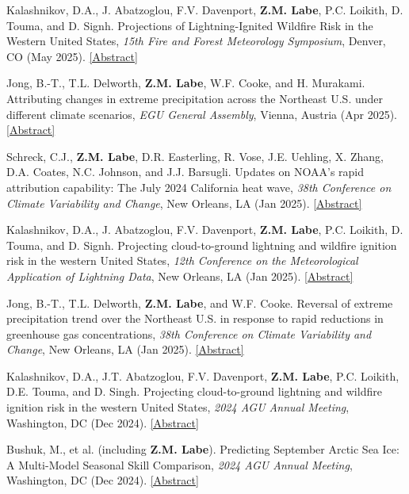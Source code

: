 \documentclass[margin,line,palatino,courier,10pt]{res}
\begin{document}
\begin{resume}
\begin{etaremune}[leftmargin=0in,topsep=0in,parsep=0in]
\item Kalashnikov, D.A., J. Abatzoglou, F.V. Davenport, \textbf{Z.M. Labe}, P.C. Loikith, D. Touma, and D. Signh. Projections of Lightning-Ignited Wildfire Risk in the Western United States, \textit{15th Fire and Forest Meteorology Symposium}, Denver, CO (May 2025). \href{https://ams.confex.com/ams/2025Summit/meetingapp.cgi/Paper/460111}{[Abstract]}
\item Jong, B.-T., T.L. Delworth, \textbf{Z.M. Labe}, W.F. Cooke, and H. Murakami. Attributing changes in extreme precipitation across the Northeast U.S. under different climate scenarios, \textit{EGU General Assembly}, Vienna, Austria (Apr 2025). \href{https://doi.org/10.5194/egusphere-egu25-10906}{[Abstract]}
\item Schreck, C.J., \textbf{Z.M. Labe}, D.R. Easterling, R. Vose, J.E. Uehling, X. Zhang, D.A. Coates, N.C. Johnson, and J.J. Barsugli. Updates on NOAA’s rapid attribution capability: The July 2024 California heat wave, \textit{38th Conference on Climate Variability and Change}, New Orleans, LA (Jan 2025). \href{https://ams.confex.com/ams/105ANNUAL/meetingapp.cgi/Paper/456803}{[Abstract]}
\item Kalashnikov, D.A., J. Abatzoglou, F.V. Davenport, \textbf{Z.M. Labe}, P.C. Loikith, D. Touma, and D. Signh. Projecting cloud-to-ground lightning and wildfire ignition risk in the western United States, \textit{12th Conference on the Meteorological Application of Lightning Data}, New Orleans, LA (Jan 2025). \href{https://ams.confex.com/ams/105ANNUAL/meetingapp.cgi/Paper/449127}{[Abstract]}
\item Jong, B.-T., T.L. Delworth, \textbf{Z.M. Labe}, and W.F. Cooke. Reversal of extreme precipitation trend over the Northeast U.S. in response to rapid reductions in greenhouse gas concentrations, \textit{38th Conference on Climate Variability and Change}, New Orleans, LA (Jan 2025). \href{https://ams.confex.com/ams/105ANNUAL/meetingapp.cgi/Paper/457313}{[Abstract]}
\item Kalashnikov, D.A., J.T. Abatzoglou, F.V. Davenport, \textbf{Z.M. Labe}, P.C. Loikith, D.E. Touma, and D. Singh. Projecting cloud-to-ground lightning and wildfire ignition risk in the western United States, \textit{2024 AGU Annual Meeting}, Washington, DC (Dec 2024). \href{https://agu.confex.com/agu/agu24/meetingapp.cgi/Paper/1570366}{[Abstract]}
\item Bushuk, M., et al. (including \textbf{Z.M. Labe}). Predicting September Arctic Sea Ice: A Multi-Model Seasonal Skill Comparison, \textit{2024 AGU Annual Meeting}, Washington, DC (Dec 2024). \href{https://agu.confex.com/agu/agu24/meetingapp.cgi/Paper/1633366}{[Abstract]}

\end{etaremune}
\end{resume}
\end{document}
